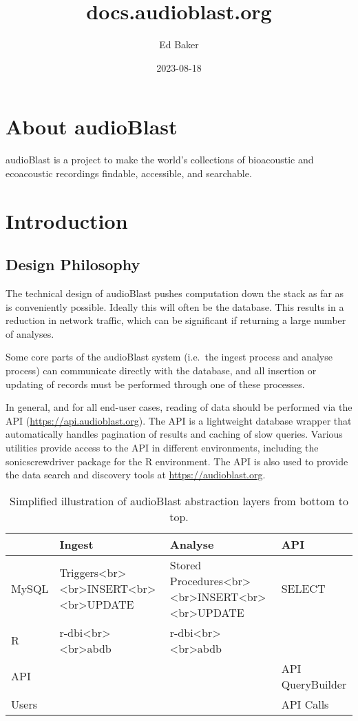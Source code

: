 \documentclass[
]{book}
\title{docs.audioblast.org}
\author{Ed Baker}
\date{2023-08-18}
\begin{document}
\maketitle

{
\setcounter{tocdepth}{1}
\tableofcontents
}
\hypertarget{about-audioblast}{%
\chapter{About audioBlast}\label{about-audioblast}}

audioBlast is a project to make the world's collections of bioacoustic and ecoacoustic recordings findable, accessible, and searchable.

\hypertarget{introduction}{%
\chapter{Introduction}\label{introduction}}

\hypertarget{design-philosophy}{%
\section{Design Philosophy}\label{design-philosophy}}

The technical design of audioBlast pushes computation down the stack as far as is conveniently possible. Ideally this will often be the database. This results in a reduction in network traffic, which can be significant if returning a large number of analyses.

Some core parts of the audioBlast system (i.e.~the ingest process and analyse process) can communicate directly with the database, and all insertion or updating of records must be performed through one of these processes.

In general, and for all end-user cases, reading of data should be performed via the API (\url{https://api.audioblast.org}). The API is a lightweight database wrapper that automatically handles pagination of results and caching of slow queries. Various utilities provide access to the API in different environments, including the sonicscrewdriver package for the R environment. The API is also used to provide the data search and discovery tools at \url{https://audioblast.org}.

\begin{table}

\caption{\label{tab:unnamed-chunk-1}Simplified illustration of audioBlast abstraction layers from 
  bottom to top.}
\centering
\begin{tabular}[t]{llll}
\toprule
  & Ingest & Analyse & API\\
\midrule
MySQL & Triggers<br><br>INSERT<br><br>UPDATE & Stored Procedures<br><br>INSERT<br><br>UPDATE & SELECT\\
R & r-dbi<br><br>abdb & r-dbi<br><br>abdb & \\
API &  &  & API QueryBuilder\\
Users &  &  & API Calls\\
\bottomrule
\end{tabular}
\end{table}
\end{document}
